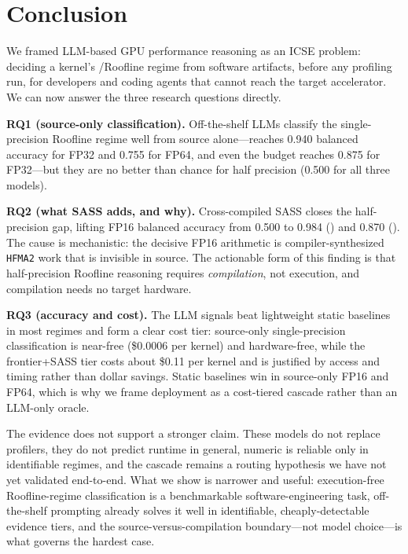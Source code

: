 \section{Conclusion}
\label{sec:conclusion}

We framed LLM-based GPU performance reasoning as an ICSE problem: deciding a kernel's \bandwidthbound/\computebound Roofline regime from software artifacts, before any profiling run, for developers and coding agents that cannot reach the target accelerator.
We can now answer the three research questions directly.

\textbf{RQ1 (source-only classification).}
Off-the-shelf LLMs classify the single-precision Roofline regime well from source alone---\opus reaches 0.940 balanced accuracy for FP32 and 0.755 for FP64, and even the budget \gptoss reaches 0.875 for FP32---but they are no better than chance for half precision (0.500 for all three models).

\textbf{RQ2 (what SASS adds, and why).}
Cross-compiled SASS closes the half-precision gap, lifting FP16 balanced accuracy from 0.500 to 0.984 (\opus) and 0.870 (\gptfivefour).
The cause is mechanistic: the decisive FP16 arithmetic is compiler-synthesized \texttt{HFMA2} work that is invisible in source.
The actionable form of this finding is that half-precision Roofline reasoning requires \emph{compilation}, not execution, and compilation needs no target hardware.

\textbf{RQ3 (accuracy and cost).}
The LLM signals beat lightweight static baselines in most regimes and form a clear cost tier: source-only single-precision classification is near-free (\$0.0006 per kernel) and hardware-free, while the frontier+SASS tier costs about \$0.11 per kernel and is justified by access and timing rather than dollar savings.
Static baselines win in source-only FP16 and \sourcesass FP64, which is why we frame deployment as a cost-tiered cascade rather than an LLM-only oracle.

The evidence does not support a stronger claim.
These models do not replace profilers, they do not predict runtime in general, numeric \rai is reliable only in identifiable regimes, and the cascade remains a routing hypothesis we have not yet validated end-to-end.
What we show is narrower and useful: execution-free Roofline-regime classification is a benchmarkable software-engineering task, off-the-shelf prompting already solves it well in identifiable, cheaply-detectable evidence tiers, and the source-versus-compilation boundary---not model choice---is what governs the hardest case.
